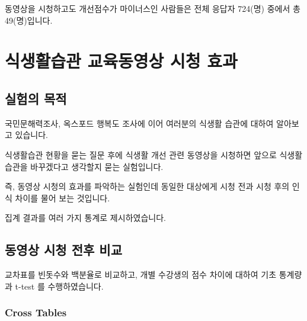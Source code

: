\documentclass[
]{book}
\begin{document}
동영상을 시청하고도 개선점수가 마이너스인 사람들은 전체 응답자 724(명) 중에서 총 49(명)입니다.

\chapter{식생활습관 교육동영상 시청 효과}\label{uxc2dduxc0dduxd65cuxc2b5uxad00-uxad50uxc721uxb3d9uxc601uxc0c1-uxc2dcuxccad-uxd6a8uxacfc-1}

\section{실험의 목적}\label{uxc2e4uxd5d8uxc758-uxbaa9uxc801-16}

국민문해력조사, 옥스포드 행복도 조사에 이어 여러분의 식생활 습관에 대하여 알아보고 있습니다.

식생활습관 현황을 묻는 질문 후에 식생활 개선 관련 동영상을 시청하면 앞으로 식생활습관을 바꾸겠다고 생각할지 묻는 실험입니다.

즉, 동영상 시청의 효과를 파악하는 실험인데 동일한 대상에게 시청 전과 시청 후의 인식 차이를 물어 보는 것입니다.

집계 결과를 여러 가지 통계로 제시하였습니다.

\section{동영상 시청 전후 비교}\label{uxb3d9uxc601uxc0c1-uxc2dcuxccad-uxc804uxd6c4-uxbe44uxad50-1}

교차표를 빈돗수와 백분율로 비교하고, 개별 수강생의 점수 차이에 대하여 기초 통계량과 t-test 를 수행하였습니다.

\subsection{Cross Tables}\label{cross-tables-1}
\end{document}
